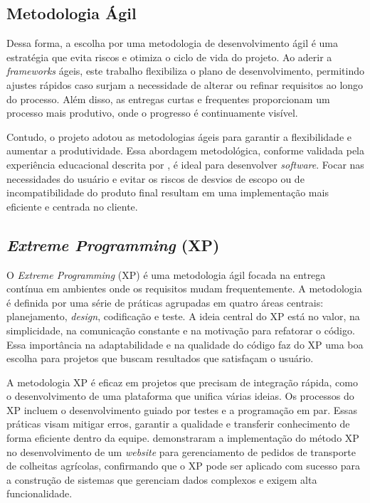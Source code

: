 \subsection{Metodologia Ágil}

Dessa forma, a escolha por uma metodologia de desenvolvimento ágil é uma estratégia que evita riscos e otimiza o ciclo de vida do projeto.
Ao aderir a \textit{frameworks} ágeis, este trabalho flexibiliza o plano de desenvolvimento, permitindo ajustes rápidos caso surjam a necessidade de alterar ou refinar requisitos ao longo do processo.
Além disso, as entregas curtas e frequentes proporcionam um processo mais produtivo, onde o progresso é continuamente visível.

Contudo, o projeto adotou as metodologias ágeis para garantir a flexibilidade e aumentar a produtividade.
Essa abordagem metodológica, conforme validada pela experiência educacional descrita por , é ideal para desenvolver \textit{software}.
Focar nas necessidades do usuário e evitar os riscos de desvios de escopo ou de incompatibilidade do produto final resultam em uma implementação mais eficiente e centrada no cliente.

\subsection{\textit{Extreme Programming} (XP)}

O \textit{Extreme Programming} (XP) é uma metodologia ágil focada na entrega contínua em ambientes onde os requisitos mudam frequentemente.
A metodologia é definida por uma série de práticas agrupadas em quatro áreas centrais: planejamento, \textit{design}, codificação e teste.
A ideia central do XP está no valor, na simplicidade, na comunicação constante e na motivação para refatorar o código.
Essa importância na adaptabilidade e na qualidade do código faz do XP uma boa escolha para projetos que buscam resultados que satisfaçam o usuário.

A metodologia XP é eficaz em projetos que precisam de integração rápida, como o desenvolvimento de uma plataforma que unifica várias ideias.
Os processos do XP incluem o desenvolvimento guiado por testes e a programação em par.
Essas práticas visam mitigar erros, garantir a qualidade e transferir conhecimento de forma eficiente dentro da equipe.
 demonstraram a implementação do método XP no desenvolvimento de um \textit{website} para gerenciamento de pedidos de transporte de colheitas agrícolas, confirmando que o XP pode ser aplicado com sucesso para a construção de sistemas que gerenciam dados complexos e exigem alta funcionalidade.

